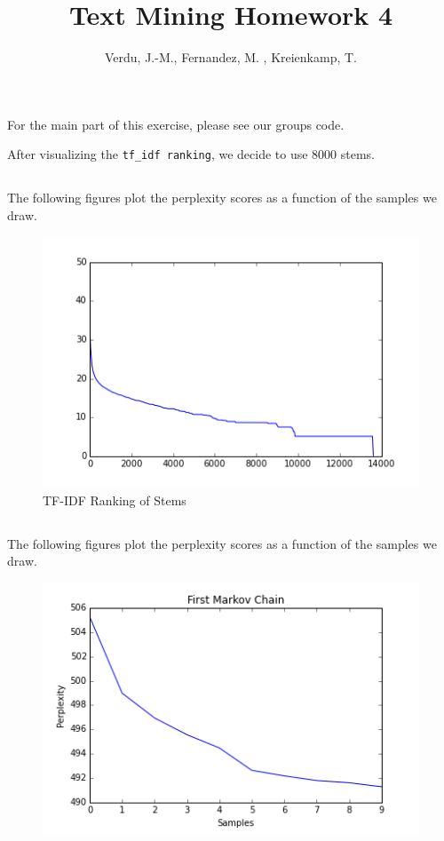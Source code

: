 \documentclass{article}
\author{Verdu, J.-M., Fernandez, M. , Kreienkamp, T.}
\title{Text Mining Homework 4}
\begin{document}
\section{}


\subsection{}

For the main part of this exercise, please see our groups code.

After visualizing the \lstinline{tf_idf ranking}, we decide to use 8000 stems. 

\subsection{}

The following figures plot the perplexity scores as a function of the samples we draw.

\begin{figure}[H]
\centering
\includegraphics[width=120mm]{tfidf_ranking.png}
\caption{TF-IDF Ranking of Stems}
\end{figure}

\subsection{}

The following figures plot the perplexity scores as a function of the samples we draw.

\begin{figure}[H]
\centering
\includegraphics[width=120mm]{firstchain.png}
\end{figure}
\end{document}
